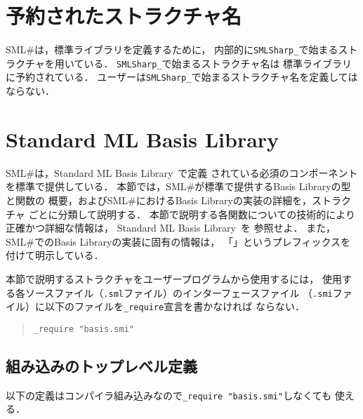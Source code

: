 \documentclass{jbook}
\newcommand{\smlsharp}{SML\#}
\begin{document}
{\section{予約されたストラクチャ名}%

	\smlsharp{}は，標準ライブラリを定義するために，
内部的に{\tt SMLSharp\_}で始まるストラクチャを用いている．
	{\tt SMLSharp\_}で始まるストラクチャ名は
標準ライブラリに予約されている．
	ユーザーは{\tt SMLSharp\_}で始まるストラクチャ名を定義しては
ならない．

\section{Standard ML Basis Library}

	\smlsharp{}は，Standard ML Basis Library~\cite{smlbasis}で定義
されている必須のコンポーネントを標準で提供している．
	本節では，\smlsharp{}が標準で提供するBasis Libraryの型と関数の
概要，および\smlsharp{}におけるBasis Libraryの実装の詳細を，ストラクチャ
ごとに分類して説明する．
	本節で説明する各関数についての技術的により正確かつ詳細な情報は，
Standard ML Basis Library~\cite{smlbasis}を
参照せよ．
	また，\smlsharp{}でのBasis Libraryの実装に固有の情報は，
「\smlsharpspecific{}」というプレフィックスを付けて明示している．

	本節で説明するストラクチャをユーザープログラムから使用するには，
使用する各ソースファイル（{\tt .sml}ファイル）のインターフェースファイル
（{\tt .smi}ファイル）に以下のファイルを{\tt \_require}宣言を書かなければ
ならない．
\begin{quote}
\tt \_require "basis.smi"
\end{quote}



\subsection{組み込みのトップレベル定義}

以下の定義はコンパイラ組み込みなので{\tt \_require "basis.smi"}しなくても
使える．

\Types


}
\end{document}
